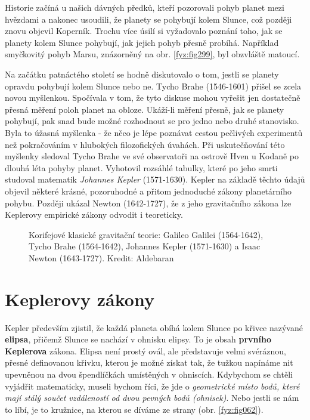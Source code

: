     Historie začíná u našich dávných předků, kteří pozorovali pohyb planet mezi hvězdami a nakonec 
    usoudili, že planety se pohybují kolem Slunce, což později znovu objevil Koperník. Trochu více 
    úsilí si vyžadovalo poznání toho, jak se planety kolem Slunce pohybují, jak jejich pohyb přesně 
    probíhá. Například smyčkovitý pohyb Marsu, znázorněný na obr. \ref{fyz:fig299}, byl obzvláště 
    matoucí.
   
    Na začátku patnáctého století se hodně diskutovalo o tom, jestli se planety opravdu pohybují 
    kolem Slunce nebo ne. Tycho Brahe (1546-1601) přišel se zcela novou myšlenkou. Spočívala v tom, 
    že tyto diskuse mohou vyřešit jen dostatečně přesná měření poloh planet na obloze. Ukáží-li 
    měření přesně, jak se planety pohybují, pak snad bude možné rozhodnout se pro jedno nebo druhé 
    stanovisko. Byla to úžasná myšlenka - že něco je lépe poznávat cestou pečlivých experimentů než 
    pokračováním v hlubokých filozofických úvahách. Při uskutečňování této myšlenky sledoval Tycho 
    Brahe ve své observatoři na ostrově Hven u Kodaně po dlouhá léta pohyby planet. Vyhotovil 
    rozsáhlé tabulky, které po jeho smrti studoval matematik \emph{Johannes Kepler} (1571-1630). 
    Kepler na základě těchto údajů objevil některé krásné, pozoruhodné a přitom jednoduché zákony 
    planetárního pohybu. Později ukázal Newton (1642-1727), že z jeho gravitačního zákona lze 
    Keplerovy empirické zákony odvodit i teoreticky.

    \begin{figure}[ht!]  %
      \centering
      \caption{Korifejové klasické gravitační teorie: Galileo Galilei (1564-1642), Tycho Brahe
               (1564-1642), Johannes Kepler (1571-1630) a Isaac Newton (1643-1727). Kredit:
               Aldebaran}
      \label{fyz:fig887}
    \end{figure}

    
  \section{Keplerovy zákony}
    Kepler především zjistil, že každá planeta obíhá kolem Slunce po křivce nazývané 
    \textbf{elipsa}, přičemž Slunce se nachází v ohnisku elipsy. To je obsah \textbf{prvního 
    Keplerova} zákona. Elipsa není prostý ovál, ale představuje velmi svéráznou, přesné definovanou 
    křivku, kterou je možné získat tak, že tužkou napínáme nit upevněnou na dvou špendlíčkách 
    umístěných v ohniscích. Kdybychom se chtěli vyjádřit matematicky, museli bychom říci, že jde o 
    \emph{geometrické místo bodů, které mají stálý součet vzdáleností od dvou pevných bodů 
    (ohnisek)}. Nebo jestli se nám to líbí, je to kružnice, na kterou se díváme ze strany (obr. 
    \ref{fyz:fig062}).
    

